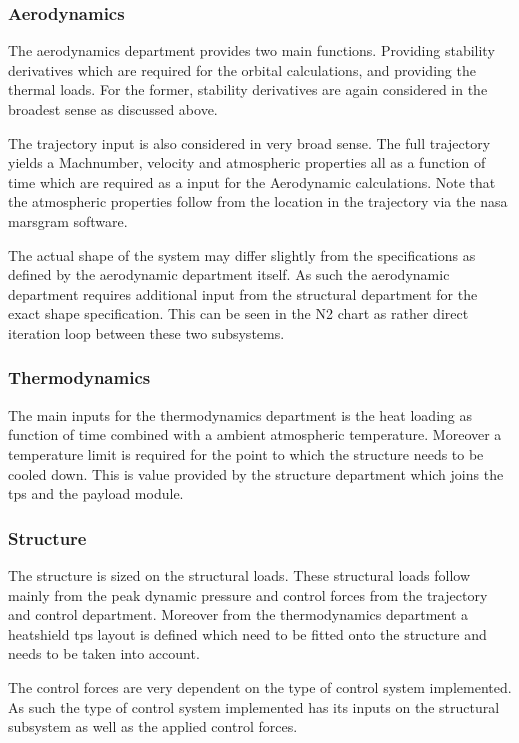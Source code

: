 \subsubsection{Aerodynamics}
The aerodynamics department provides two main functions. Providing stability derivatives which are required for the orbital calculations, and providing the thermal loads. 
For the former, stability derivatives are again considered in the broadest sense as discussed above. 

The trajectory input is also considered in very broad sense. The full trajectory yields a Machnumber, velocity and atmospheric properties all as a function of time which are required as a input for the Aerodynamic calculations. Note that the atmospheric properties follow from the location in the trajectory via the \gls{nasa} \gls{marsgram} software\cite{Justus2001}.

The actual shape of the system may differ slightly from the specifications as defined by the aerodynamic department itself. As such the aerodynamic department requires additional input from the structural department for the exact shape specification. This can be seen in the N2 chart as rather direct iteration loop between these two subsystems.

\subsubsection{Thermodynamics}
The main inputs for the thermodynamics department is the heat loading as function of time combined with a ambient atmospheric temperature. Moreover a temperature limit is required for the point to which the structure needs to be cooled down. This is value provided by the structure department which joins the \gls{tps} and the payload module.

\subsubsection{Structure}

The structure is sized on the structural loads. These structural loads follow mainly from the peak dynamic pressure and control forces from the trajectory and control department. Moreover from the thermodynamics department a heatshield \gls{tps} layout is defined which need to be fitted onto the structure and needs to be taken into account. 

The control forces are very dependent on the type of control system implemented. As such the type of control system implemented has its inputs on the structural subsystem as well as the applied control forces. 

